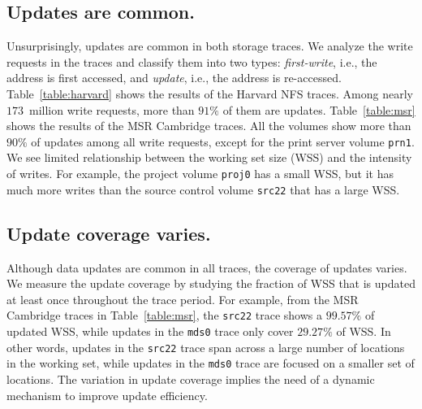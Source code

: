 \subsection{Updates are common.} Unsurprisingly, updates are common in both
storage traces.  We analyze the write requests in the traces and classify them
into two types: {\em first-write}, i.e., the address is first accessed, and
{\em update}, i.e., the address is re-accessed.  Table~\ref{table:harvard}
shows the results of the Harvard NFS traces.  Among nearly $173$~million
write requests, more than $91\%$ of them are updates.  Table~\ref{table:msr}
shows the results of the MSR Cambridge traces. All the volumes show more than
$90\%$ of updates among all write requests, except for the print server volume
\texttt{prn1}. We see limited relationship between the working set size (WSS)
and the intensity of writes.  For example, the project volume \texttt{proj0}
has a small WSS, but it has much more writes than the source control volume
\texttt{src22} that has a large WSS.

\subsection{Update coverage varies.} Although data updates are common in all
traces, the coverage of updates varies. %
We measure the update coverage by studying the fraction of WSS that is updated
at least once throughout the trace period. For example, from the MSR Cambridge
traces in Table~\ref{table:msr}, the \texttt{src22} trace shows a $99.57\%$ of
updated WSS, while updates in the \texttt{mds0} trace only cover $29.27\%$ of
WSS. In other words, updates in the \texttt{src22} trace span across a large
number of locations in the working set, while updates in the \texttt{mds0}
trace are focused on a smaller set of locations.  The variation in update
coverage implies the need of a dynamic mechanism to improve update efficiency.



